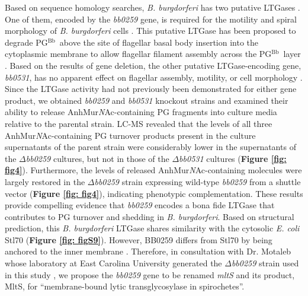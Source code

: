 \documentclass[twoside, watermark]{zHenriquesLab-StyleBioRxiv}
\newcommand{\pgbb}{PG$^\text{Bb}$}
\newcommand{\AnhNAM}{AnhMur\textit{N}Ac}
\begin{document}
\vspace{1mm}
Based on sequence homology searches, \textit{B. burgdorferi} has two putative LTGases \cite{Xu2021}. One of them, encoded by the \textit{bb0259} gene, is required for the motility and spiral morphology of \textit{B. burgdorferi} cells \cite{Xu2021}. This putative LTGase has been proposed to degrade \pgbb~above the site of flagellar basal body insertion into the cytoplasmic membrane to allow flagellar filament assembly across the \pgbb~layer \cite{Xu2021}. Based on the results of gene deletion, the other putative LTGase-encoding gene, \textit{bb0531}, has no apparent effect on flagellar assembly, motility, or cell morphology \cite{Xu2021}. Since the LTGase activity had not previously been demonstrated for either gene product, we obtained \textit{bb0259} and \textit{bb0531} knockout strains \cite{Xu2021} and examined their ability to release \AnhNAM-containing PG fragments into culture media relative to the parental strain. LC-MS revealed that the levels of all three \AnhNAM-containing PG turnover products present in the culture supernatants of the parent strain were considerably lower in the supernatants of the $\Delta$\textit{bb0259} cultures, but not in those of the $\Delta$\textit{bb0531} cultures (\textbf{Figure \ref{fig: fig4}}). Furthermore, the levels of released \AnhNAM-containing molecules were largely restored in the $\Delta$\textit{bb0259} strain expressing wild-type \textit{bb0259} from a shuttle vector (\textbf{Figure \ref{fig: fig4}}), indicating phenotypic complementation. These results provide compelling evidence that \textit{bb0259} encodes a bona fide LTGase that contributes to PG turnover and shedding in \textit{B. burgdorferi}. Based on structural prediction, this \textit{B. burgdorferi} LTGase shares similarity with the cytosolic \textit{E. coli} Stl70 (\textbf{Figure \ref{fig: figS9}}). However, BB0259 differs from Stl70 by being anchored to the inner membrane \cite{Toledo2018}. Therefore, in consultation with Dr. Motaleb whose laboratory at East Carolina University generated the $\Delta$\textit{bb0259} strain used in this study \cite{Xu2021}, we propose the \textit{bb0259} gene to be renamed \textit{mltS} and its product, MltS, for “membrane-bound lytic transglycosylase in spirochetes”.
\end{document}
